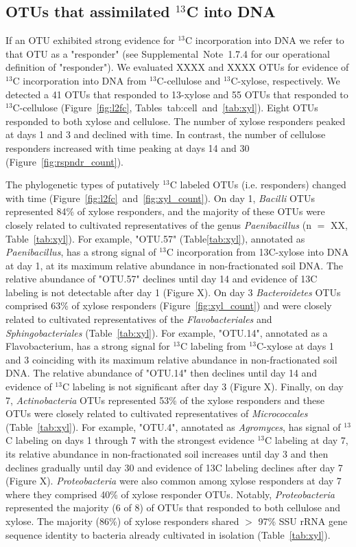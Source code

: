 \subsection{OTUs that assimilated $^{13}$C into DNA} \label{responders}
If an OTU exhibited strong evidence for $^{13}$C incorporation into DNA we
refer to that OTU as a "responder" (see Supplemental Note 1.7.4 for our
operational definition of "responder"). We evaluated XXXX and XXXX OTUs for
evidence of $^{13}$C incorporation into DNA from $^{13}$C-cellulose and
$^{13}$C-xylose, respectively. We detected a 41 OTUs that responded to
13-xylose and 55 OTUs that responded to $^{13}$C-cellulose (Figure~\ref{fig:l2fc}, 
Tables~{tab:cell}~and~\ref{tab:xyl}). Eight OTUs responded to both xylose and
cellulose. The number of xylose responders peaked at days 1 and 3 and declined
with time. In contrast, the number of cellulose responders increased with time
peaking at days 14 and 30 (Figure~\ref{fig:rspndr_count}). 

The phylogenetic types of putatively $^{13}$C labeled OTUs (i.e. responders)
changed with time (Figure~\ref{fig:l2fc}~and~\ref{fig:xyl_count}). On day 1,
\textit{Bacilli} OTUs represented 84\% of xylose responders, and the majority
of these OTUs were closely related to cultivated representatives of the genus
\textit{Paenibacillus} (n $=$ XX, Table~\ref{tab:xyl}). For example, "OTU.57"
(Table\ref{tab:xyl}), annotated as \textit{Paenibacillus}, has a strong signal
of $^{13}$C incorporation from 13C-xylose into DNA at day 1, at its maximum
relative abundance in non-fractionated soil DNA. The relative abundance of
"OTU.57" declines until day 14 and evidence of 13C labeling is not detectable
after day 1 (Figure X). On day 3 \textit{Bacteroidetes} OTUs comprised 63\% of
xylose responders (Figure~\ref{fig:xyl_count}) and were closely related to
cultivated representatives of the \textit{Flavobacteriales} and
\textit{Sphingobacteriales} (Table~\ref{tab:xyl}). For example, "OTU.14",
annotated as a Flavobacterium, has a strong signal for $^{13}$C labeling from
$^{13}$C-xylose at days 1 and 3 coinciding with its maximum relative abundance
in non-fractionated soil DNA. The relative abundance of "OTU.14" then declines
until day 14 and evidence of $^{13}$C  labeling is not significant after day
3 (Figure X). Finally, on day 7, \textit{Actinobacteria} OTUs represented 53\%
of the xylose responders and these OTUs were closely related to cultivated
representatives of \textit{Micrococcales} (Table~\ref{tab:xyl}). For example,
"OTU.4", annotated as \textit{Agromyces}, has signal of $^{13}$C labeling on
days 1 through 7 with the strongest evidence $^{13}$C labeling at day 7, its
relative abundance in non-fractionated soil increases until day
3 and then declines gradually until day 30 and evidence of 13C labeling
declines after day 7 (Figure X). \textit{Proteobacteria} were also common
among xylose responders at day 7 where they comprised 40\% of xylose responder
OTUs. Notably, \textit{Proteobacteria} represented the majority (6 of
8) of OTUs that responded to both cellulose and xylose. The
majority (86\%) of xylose responders shared $>$ 97\% SSU rRNA gene
sequence identity to bacteria already cultivated in isolation
(Table~\ref{tab:xyl}). 

